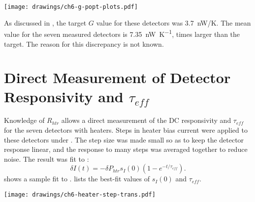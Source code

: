 \begin{figure*}
\texttt{[image: drawings/ch6-g-popt-plots.pdf]}
\caption[Impact of different $P_{opt}$ assumptions]{
Plots showing effect of $P_{opt}$ assumptions on $G$ and $T_c$ measurements.
\textbf{Left} Plot showing variation of $G$ for  vs assumed value of $P_{opt}$.
The statistical uncertainty in $G$ for this detector is approximately the same as the systematic uncertainty that results from the estimation of $P_{opt}$.
\textbf{Right} Plot showing variation of $T_c$ for  vs assumed value of $P_{opt}$.
In this case the systematic uncertainty is larger than the statistical uncertainty, although the change is only \SI{2.2}{\percent} as $P_{opt}$ increases from \SI{100}{\pW} to \SI{300}{\pW}.
The value of $n$ shows no trend with $P_{opt}$.
} 
\label{fig:heater-g-popt-plots}
\end{figure*}

As discussed in , the target $G$ value for these detectors was 3.7~nW/K.
The mean value for the seven measured detectors is \SI{7.35}{\nano\watt\per\kelvin},  times larger than the target.
The reason for this discrepancy is not known.

\section{Direct Measurement of Detector Responsivity and $\tau_{eff}$} \label{sec:teff-resp}

%
%

Knowledge of $R_{htr}$ allows a direct measurement of the DC responsivity and $\tau_{eff}$ for the seven detectors with heaters.
Steps in heater bias current were applied to these detectors under \SOC.
The step size was made small so as to keep the detector response linear, and the response to many steps was averaged together to reduce noise.
The result was fit to :
\begin{equation} \label{eqn:ch6-heater-step-trans}
  \delta I(t) = - \delta P_{htr} s_I(0) (1 - e^{-t/\tau_{eff}}).
\end{equation}
 shows a sample fit to .
 lists the best-fit values of $s_I(0)$ and $\tau_{eff}$.

\begin{figure*}
\centering
\texttt{[image: drawings/ch6-heater-step-trans.pdf]}
\caption[Detector response to heater steps]{
Plot showing response of detector  to step in applied heater power of \SI{1.41}{\pico\watt}.
Plots are for  biased into \SOC.
The data averaged over 32 steps (16 up and 16 down), along with best fit to , are plotted.
The step in applied power begins at $t \approx \SI{0.6}{\ms}$, not $t = \SI{0}{\ms}$.
} 
\label{fig:ch6-heater-step-trans}
\end{figure*}

